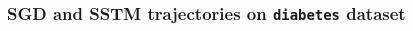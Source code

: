 \begin{frame}
    \frametitle{SGD and SSTM trajectories on \texttt{diabetes} dataset}
    \begin{multicols}{2}
        \noindent
         \par
        
    \end{multicols}
\end{frame}
